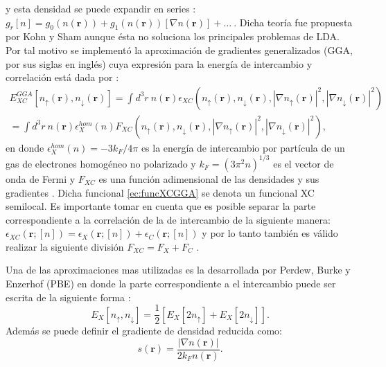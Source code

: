   y esta densidad se puede expandir en series \cite{PhysRevLett.22.807}:
$
   g_{r} [n] = g_0 (n(\pmb{r}))+ g_1 (n(\pmb{r})) [\nabla n(\pmb{r})]+ \ldots~
 .$
   Dicha  teor\'ia fue propuesta por Kohn y Sham\cite{PhysRev.140.A1133} aunque \'esta no soluciona los principales problemas de LDA. Por tal motivo se implement\'o la aproximaci\'on de gradientes generalizados (GGA, por sus siglas en ingl\'es) cuya expresi\'on para la energ\'ia de intercambio y correlaci\'on est\'a dada por \cite{Perdew1996ComparisonSF}:
   \begin{multline}
      E_{XC}^{GGA} [n_{\uparrow} (\pmb{r}), n_{\downarrow}(\pmb{r})] = \int d^3 r ~ n(\pmb{r}) \epsilon_{XC} \left(n_{\uparrow} (\pmb{r}), n_{\downarrow}(\pmb{r}), \left|\nabla n_{\uparrow} (\pmb{r}) \right|^2, \left|\nabla n_{\downarrow} (\pmb{r}) \right|^2 \right)  \\
      = \int d^3 r ~ n(\pmb{r}) \epsilon_{X}^{hom} (n) F_{XC} \left(n_{\uparrow} (\pmb{r}), n_{\downarrow}(\pmb{r}), \left|\nabla n_{\uparrow} (\pmb{r}) \right|^2, \left|\nabla n_{\downarrow} (\pmb{r}) \right|^2 \right), \label{ec:funcXCGGA}
   \end{multline}
   en donde $ \epsilon_{X}^{hom} (n) = -3k_F / 4\pi $ es la energ\'ia de intercambio por part\'icula  de un gas de electrones homog\'eneo no polarizado y  $k_F = (3 \pi^2 n)^{1/3}$ es el vector de onda de Fermi y $F_{XC}$ es una funci\'on adimensional de las densidades y sus gradientes \cite{Martin-2004}. Dicha funcional \ref{ec:funcXCGGA} se denota un funcional XC semilocal. Es importante tomar en cuenta que es posible separar la parte correspondiente a la correlaci\'on de la de intercambio de la siguiente manera: $ \epsilon_{XC} (\pmb{r}; [n] )= \epsilon_{X} (\pmb{r}; [n] )+ \epsilon_{C} (\pmb{r}; [n] ) $ y por lo tanto tambi\'en es v\'alido realizar la siguiente divisi\'on $ F_{XC} = F_{X}+ F_{C} $ \cite{MB-2015}.
   \newline
   \par Una de las aproximaciones mas utilizadas es la desarrollada por Perdew, Burke y Enzerhof (PBE) en donde la parte correspondiente a el intercambio puede ser escrita de la siguiente forma \cite{PhysRevLett.77.3865, mo_2004}:
   \begin{equation}
   E_X [n_{\uparrow}, n_{\downarrow}]= \frac{1}{2} \left[E_{X} [2 n_{\uparrow}] + E_{X} [2 n_{\downarrow}]   \right]. \label{ec:divEx}
   \end{equation}
   Adem\'as se puede definir el gradiente de densidad reducida como:
   \begin{equation}
   s(\pmb{r})= \frac{|\nabla n (\pmb{r})|}{2 k_F n (\pmb{r}) }. \label{ec:S}
   \end{equation}
